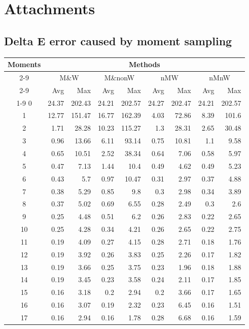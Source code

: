\chapter{Attachments}

\section{Delta E error caused by moment sampling} \label{sec:completeMomentError}

\begin{table}[h]
	\centering
	\begin{tabular}{crrrrrrrr}
		\toprule
		\multirow{4}{*}{Moments} &
		\multicolumn{8}{c}{Methods} \\
		\cmidrule(lr){2-9}
		&\multicolumn{2}{c}{M\&W} &
		\multicolumn{2}{c}{M\&nonW} &
		\multicolumn{2}{c}{nMW} &
		\multicolumn{2}{c}{nMnW}\\
		\cmidrule(lr){2-9}
		& Avg & Max & Avg & Max & Avg & Max & Avg & Max \\
		\cmidrule(lr){1-9}
		0&24.37&202.43&24.21&202.57&24.27&202.47&24.21&202.57\\
		1&12.77&151.47&16.77&162.39&4.03&72.86&8.39&101.6\\
		2&1.71&28.28&10.23&115.27&1.3&28.31&2.65&30.48\\
		3&0.96&13.66&6.11&93.14&0.75&10.81&1.1&9.58\\
		4&0.65&10.51&2.52&38.34&0.64&7.06&0.58&5.97\\
		5&0.47&7.13&1.44&10.4&0.49&4.62&0.49&5.23\\
		6&0.43&5.7&0.97&10.47&0.31&2.97&0.37&4.88\\
		7&0.38&5.29&0.85&9.8&0.3&2.98&0.34&3.89\\
		8&0.37&5.02&0.69&6.55&0.28&2.49&0.3&2.6\\ 
		9&0.25&4.48&0.51&6.2&0.26&2.83&0.22&2.65\\
		10&0.25&4.28&0.34&4.21&0.26&2.65&0.22&2.75\\
		11&0.19&4.09&0.27&4.15&0.28&2.71&0.18&1.76\\
		12&0.19&3.92&0.26&3.83&0.25&2.26&0.17&1.82\\
		13&0.19&3.66&0.25&3.75&0.23&1.96&0.18&1.88\\
		14&0.19&3.45&0.23&3.58&0.24&2.11&0.17&1.85\\
		15&0.16&3.18&0.2&2.94& 0.2&3.66&0.17&1.65\\
		16&0.16&3.07&0.19&2.32&0.23&6.45&0.16&1.51\\
		17&0.16&2.94&0.16&1.78&0.28&6.68&0.16&1.59\\

\end{tabular}
\end{table}
